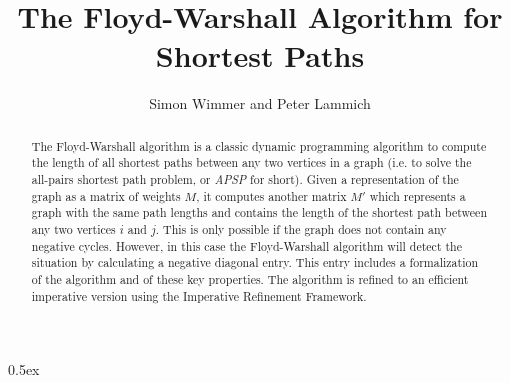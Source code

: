 \documentclass[11pt,a4paper]{article}
\newcommand{\fw}{Floyd-Warshall algorithm\xspace}
\begin{document}
\title{The Floyd-Warshall Algorithm for Shortest Paths}
\author{Simon Wimmer and Peter Lammich}

\maketitle
\begin{abstract}
  The \fw \cite{floyd, roy, warshall} is a classic dynamic programming algorithm to compute
  the length of all shortest paths between any two vertices in a graph
  (i.e. to solve the all-pairs shortest path problem, or \textit{APSP} for short).
  Given a representation of the graph as a matrix of weights $M$, it computes another matrix $M'$
  which represents a graph with the same path lengths and contains the length of the shortest path
  between any two vertices $i$ and $j$.
  This is only possible if the graph does not contain any negative cycles. However, in this case the \fw will detect the situation by
  calculating a negative diagonal entry.
  This entry includes a formalization of the algorithm and of these key properties.
  The algorithm is refined to an efficient imperative version using the Imperative Refinement Framework.
\end{abstract}

\setcounter{tocdepth}{2}
\tableofcontents
\newpage

\parindent 0pt\parskip 0.5ex





\end{document}
